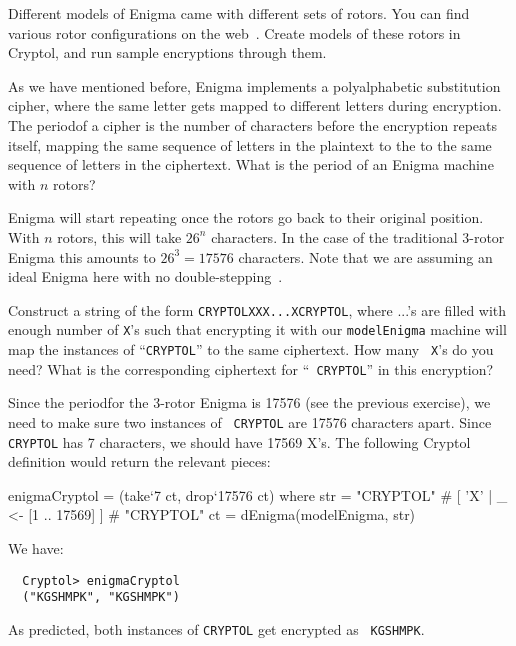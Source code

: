 \begin{Exercise}\label{ex:enigma:9}
  Different models of Enigma came with different sets of rotors. You
  can find various rotor configurations on the
  web~\cite{wiki:enigmarotors}.  Create models of these rotors in
  Cryptol, and run sample encryptions through them.
\end{Exercise}

\begin{Exercise}\label{ex:enigma:10}
  As we have mentioned before, Enigma implements a polyalphabetic
  substitution cipher\indPolyAlphSubst, where the same letter gets
  mapped to different letters during encryption. The
  period\indSubstPeriod of a cipher is the number of characters before
  the encryption repeats itself, mapping the same sequence of letters
  in the plaintext to the to the same sequence of letters in the
  ciphertext. What is the period of an Enigma machine with $n$ rotors?
\end{Exercise}
\begin{Answer}
  Enigma will start repeating once the rotors go back to their
  original position.  With $n$ rotors, this will take $26^n$
  characters. In the case of the traditional 3-rotor Enigma this
  amounts to $26^3 = 17576$ characters. Note that we are assuming an
  ideal Enigma here with no double-stepping~\cite{enigmaAnomaly}.
\end{Answer}

\begin{Exercise}\label{ex:enigma:11}
  Construct a string of the form {\tt CRYPTOLXXX...XCRYPTOL}, where
  ...'s are filled with enough number of {\tt X}'s such that
  encrypting it with our {\tt modelEnigma} machine will map the
  instances of ``{\tt CRYPTOL}'' to the same ciphertext. How many {\tt
    X}'s do you need? What is the corresponding ciphertext for ``{\tt
    CRYPTOL}'' in this encryption?
\end{Exercise}
\begin{Answer}
  Since the period\indSubstPeriod for the 3-rotor Enigma is 17576 (see
  the previous exercise), we need to make sure two instances of {\tt
    CRYPTOL} are 17576 characters apart. Since {\tt CRYPTOL} has 7
  characters, we should have 17569 X's. The following Cryptol
  definition would return the relevant pieces:
\begin{code}
  enigmaCryptol = (take`{7} ct, drop`{17576} ct)
    where   str = "CRYPTOL" # [ 'X' | _ <- [1 .. 17569] ] 
                  # "CRYPTOL"
            ct  = dEnigma(modelEnigma, str)
\end{code}
We have:
\begin{Verbatim}
  Cryptol> enigmaCryptol
  ("KGSHMPK", "KGSHMPK")
\end{Verbatim}
As predicted, both instances of {\tt CRYPTOL} get encrypted as {\tt
  KGSHMPK}.
\end{Answer}

